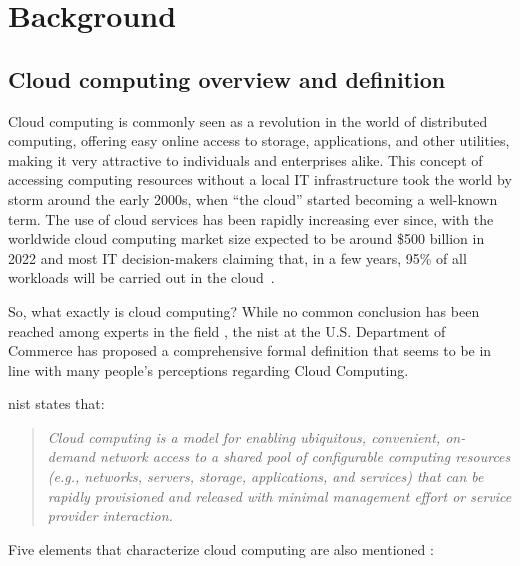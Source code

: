 \chapter{Background}\label{ch:background}


\section{Cloud computing overview and definition}

Cloud computing is commonly seen as a revolution in the world of distributed computing, offering easy online access to storage, applications, and other utilities, making it very attractive to individuals and enterprises alike. This concept of accessing computing resources without a local IT infrastructure took the world by storm around the early 2000s, when ``the cloud'' started becoming a well-known term. The use of cloud services has been rapidly increasing ever since, with the worldwide cloud computing market size expected to be around \$500 billion in 2022 \cite{gvr} and most IT decision-makers claiming that, in a few years, 95\% of all workloads will be carried out in the cloud~\cite{logicmonitor}. 

So, what exactly is cloud computing? While no common conclusion has been reached among experts in the field \cite{cmany}, the \ac{nist} \cite{nist} at the U.S. Department of Commerce has proposed a comprehensive formal definition that seems to be in line with many people's perceptions regarding Cloud Computing.

\ac{nist} states that: \blockquote{\textit{Cloud computing is a model for enabling ubiquitous, convenient, on-demand network access to a shared pool of configurable computing resources (e.g., networks, servers, storage, applications, and services) that can be rapidly provisioned and released with minimal management effort or service provider interaction.}}

Five elements that characterize cloud computing are also mentioned \cite{nist,c2,cmany}:

